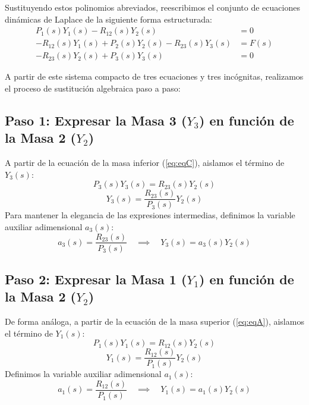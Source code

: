\documentclass[12pt,letterpaper]{article}
\begin{document}
Sustituyendo estos polinomios abreviados, reescribimos el conjunto de ecuaciones dinámicas de Laplace de la siguiente forma estructurada:
\begin{align}
P_1(s) Y_1(s) - R_{12}(s) Y_2(s) &= 0 \label{eq:eqA} \\
-R_{12}(s) Y_1(s) + P_2(s) Y_2(s) - R_{23}(s) Y_3(s) &= F(s) \label{eq:eqB} \\
-R_{23}(s) Y_2(s) + P_3(s) Y_3(s) &= 0 \label{eq:eqC}
\end{align}

A partir de este sistema compacto de tres ecuaciones y tres incógnitas, realizamos el proceso de sustitución algebraica paso a paso:

\subsection{Paso 1: Expresar la Masa 3 ($Y_3$) en función de la Masa 2 ($Y_2$)}
A partir de la ecuación de la masa inferior (\ref{eq:eqC}), aislamos el término de $Y_3(s)$:
\[ P_3(s) Y_3(s) = R_{23}(s) Y_2(s) \]
\[ Y_3(s) = \frac{R_{23}(s)}{P_3(s)} Y_2(s) \]
Para mantener la elegancia de las expresiones intermedias, definimos la variable auxiliar adimensional $a_3(s)$:
\begin{equation}
a_3(s) = \frac{R_{23}(s)}{P_3(s)} \quad \implies \quad Y_3(s) = a_3(s) Y_2(s)
\label{eq:subX3}
\end{equation}

\subsection{Paso 2: Expresar la Masa 1 ($Y_1$) en función de la Masa 2 ($Y_2$)}
De forma análoga, a partir de la ecuación de la masa superior (\ref{eq:eqA}), aislamos el término de $Y_1(s)$:
\[ P_1(s) Y_1(s) = R_{12}(s) Y_2(s) \]
\[ Y_1(s) = \frac{R_{12}(s)}{P_1(s)} Y_2(s) \]
Definimos la variable auxiliar adimensional $a_1(s)$:
\begin{equation}
a_1(s) = \frac{R_{12}(s)}{P_1(s)} \quad \implies \quad Y_1(s) = a_1(s) Y_2(s)
\label{eq:subX1}
\end{equation}
\end{document}
